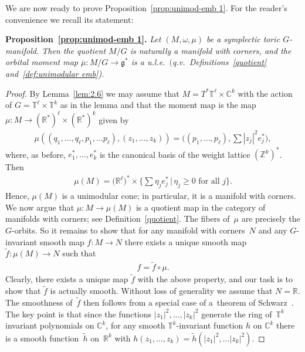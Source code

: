 \documentclass[10pt,a4paper]{amsart}
\numberwithin{equation}{section}
\begin{document}
We are now ready to prove Proposition~\ref{prop:unimod-emb 1}. For the
reader's convenience we recall
its statement:

\medskip

\noindent
{\bf Proposition~\ref{prop:unimod-emb 1}.} {\em
Let $(M, \omega, \mu)$ be a symplectic toric $G$-manifold.
Then the quotient $M/G$ is naturally a manifold with corners,
and the orbital moment map $\overline{\mu} \colon M/G\to {\mathfrak g}^*$ is a u.l.e.\
$($q.v.\ Definitions~{\rm \ref{quotient}} and~{\rm \ref{def:unimodular emb})}.}

\medskip

\begin{proof}%
  By Lemma~\ref{lem:2.6} we may assume %
  that $M = T^* {\mathbb T}^\ell \times {\mathbb C}^k$ with the action of $G = {\mathbb T}^\ell
  \times {\mathbb T}^k$ as in the lemma
  and that the moment map is the map $\mu \colon M \to ({\mathbb R}^*)^\ell
  \times ({\mathbb R}^*)^k$ given by
\begin{gather*}
\mu ((q_1, \ldots, q_\ell, p_1, \ldots p_\ell), (z_1,\ldots, z_k))
  =   \Big(   (p_1,\ldots, p_\ell)   ,   \sum |z_j|^2 e_j^*   \Big)   ,
\end{gather*}
where, as before, $e_1^*,\ldots,e_k^*$ is the canonical basis
of the weight lattice $({\mathbb Z}^k)^*$.
Then
\begin{gather*}
 \mu(M) = \big({\mathbb R}^\ell\big)^*   \times
           \Big\{   \sum \eta_j e_j^* \, | \,
             \eta_j \geq 0 \text{ for all $j$} \Big\}.
\end{gather*}
Hence, $\mu(M)$ is a unimodular cone; in particular, it is a manifold
with corners.
We now argue that $\mu \colon M \to \mu(M)$ is a quotient map
in the category of manifolds with corners; see Def\/inition~\ref{quotient}.
The f\/ibers of~$\mu$ are precisely the $G$-orbits.
So it remains to show that for any manifold with corners~$N$
and any $G$-invariant smooth map $f \colon M \to N$
there exists a unique smooth map
$\tilde{f} \colon \mu(M)\to N$ such that
\begin{gather*}
f = \tilde{f} \circ \mu.
\end{gather*}
Clearly, there exists a unique map $\tilde{f}$ with the above property,
and our task is to show that $\tilde{f}$ is actually smooth.
Without loss of generality we assume that $N = {\mathbb R}$.
The smoothness of~$\tilde{f}$ then follows from a special case of a~theorem of Schwarz~\cite{sc:sm}. The key point is that since the
functions $ |z_1|^2, \ldots, |z_k|^2$ generate the ring of~$ {\mathbb T}^k$
invariant polynomials on ${\mathbb C}^k$, for any smooth ${\mathbb T}^k$-invariant
function $h$ on ${\mathbb C}^k$ there is a smooth function~$\tilde{h} $ on~${\mathbb R}^k$ with $h (z_1, \ldots, z_k) = \tilde{h} (|z_1|^2,\ldots |z_k|^2)$.
\end{proof}
\end{document}
